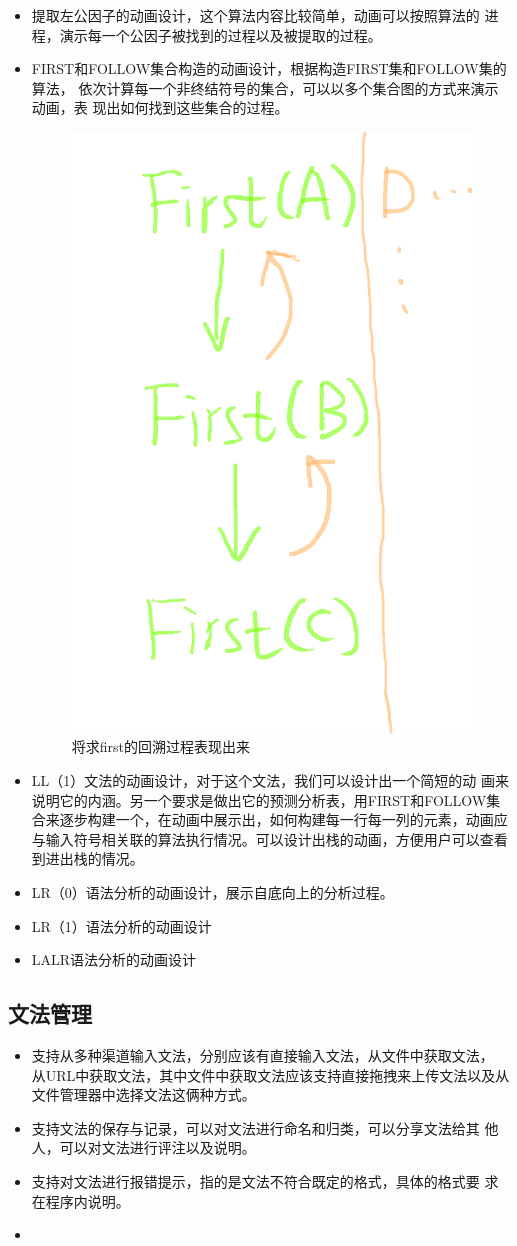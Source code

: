 \begin{itemize}
\begin{figure}[!htb]
            \end{figure}
\item 提取左公因子的动画设计，这个算法内容比较简单，动画可以按照算法的
  进程，演示每一个公因子被找到的过程以及被提取的过程。
\item FIRST和FOLLOW集合构造的动画设计，根据构造FIRST集和FOLLOW集的算法，
  依次计算每一个非终结符号的集合，可以以多个集合图的方式来演示动画，表
  现出如何找到这些集合的过程。
              \begin{figure}[!htb]
              	\centering
              	\includegraphics[width=0.4\linewidth]{img/first.png}
              	\caption{将求first的回溯过程表现出来}
              	\label{fig:first.png}
              \end{figure}
\item LL（1）文法的动画设计，对于这个文法，我们可以设计出一个简短的动
  画来说明它的内涵。另一个要求是做出它的预测分析表，用FIRST和FOLLOW集
  合来逐步构建一个，在动画中展示出，如何构建每一行每一列的元素，动画应
  与输入符号相关联的算法执行情况。可以设计出栈的动画，方便用户可以查看
  到进出栈的情况。
\item LR（0）语法分析的动画设计，展示自底向上的分析过程。
\item LR（1）语法分析的动画设计
\item LALR语法分析的动画设计
\end{itemize}
\subsection{文法管理}
\begin{itemize}
\item 支持从多种渠道输入文法，分别应该有直接输入文法，从文件中获取文法，
  从URL中获取文法，其中文件中获取文法应该支持直接拖拽来上传文法以及从
  文件管理器中选择文法这俩种方式。
\item 支持文法的保存与记录，可以对文法进行命名和归类，可以分享文法给其
  他人，可以对文法进行评注以及说明。
\item 支持对文法进行报错提示，指的是文法不符合既定的格式，具体的格式要
  求在程序内说明。
\item 
\end{itemize}